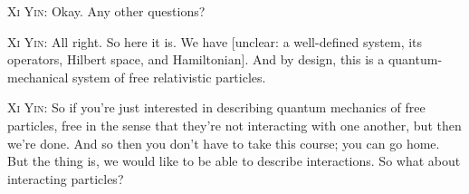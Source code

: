 
\noindent\textsc{Xi Yin:} Okay. Any other questions?\par

\noindent\textsc{Xi Yin:} All right. So here it is. We have [unclear: a well-defined system, its operators, Hilbert space, and Hamiltonian]. And by design, this is a quantum-mechanical system of free relativistic particles.\par

\noindent\textsc{Xi Yin:} So if you're just interested in describing quantum mechanics of free particles, free in the sense that they're not interacting with one another, but then we're done. And so then you don't have to take this course; you can go home. But the thing is, we would like to be able to describe interactions. So what about interacting particles?\par


